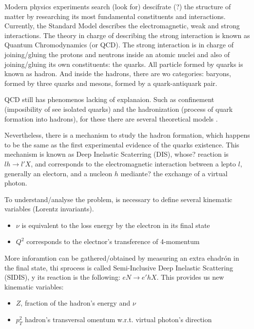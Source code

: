 Modern physics experiments search (look for) descifrate (?) the structure of matter by researching its most fundamental constituents and interactions. Currently, the Standard Model describes the electromagnetic, weak and strong interactions. The theory in charge of describing the strong interaction is known as Quantum Chromodynamics (or QCD). The strong interaction is in charge of joining/gluing the protons and neutrons inside an atomic nuclei and also of joining/gluing its own constituents: the quarks. All particle formed by quarks is known as hadron. And inside the hadrons, there are wo categories: baryons, formed by three quarks and mesons, formed by a quark-antiquark pair.

QCD still has phenomenos lacking of explanaion. Such as confinement (imposibility of see isolated quarks) and the hadronization (process of quark formation into hadrons), for these there are several theoretical models \cite{tm1, tm2, tm3}.

Nevertheless, there is a mechanism to study the hadron formation, which happens to be the same as the first experimental evidence of the quarks existence. This mechanism is known as Deep Inelastic Scaterring (DIS), whose? reaction is $l h \rightarrow l' X$, and corresponds to the electromagnetic interaction between a lepto $l$, generally an electorn, and a nucleon $h$ mediante? the exchange of a virtual photon.


To understand/analyse the problem, is necessary to define several kinematic variables (Lorentz invariants).
\begin{itemize}
  \item $\nu$ is equivalent to the loss energy by the electron in its final state
  \item $Q^2$ corresponds to the electnor's transference of 4-momentum
\end{itemize}
More inforamtion can be gathered/obtained by measuring an extra ehadrón in the final state, thi sprocess is called Semi-Inclusive Deep Inelastic Scattering (SIDIS), y its reaction is the following:  $e N \rightarrow e' h X$. This provides us new kinematic variables:
\begin{itemize}
  \item $Z$, fraction of the hadron's energy and $\nu$
  \item $p_T^2$ hadron's transversal omentum w.r.t. virtual photon's direction
\end{itemize}

